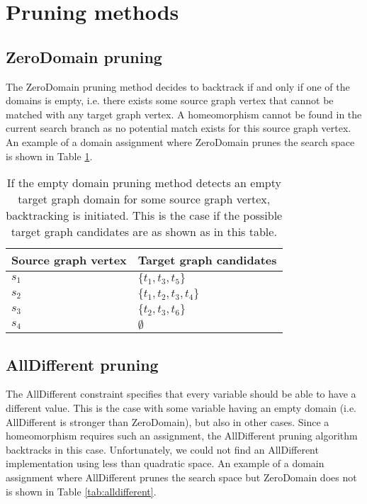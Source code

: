 \section{Pruning methods}
\label{sec:pruningmethods}
\subsection{ZeroDomain pruning}
The ZeroDomain pruning method decides to backtrack if and only if one of the domains is empty, i.e. there exists some source graph vertex that cannot be matched with any target graph vertex. A homeomorphism cannot be found in the current search branch as no potential match exists for this source graph vertex. An example of a domain assignment where ZeroDomain prunes the search space is shown in Table \ref{tab:zerodomain}.

\label{sec:emptyDomain}
\begin{table}
\centering
\begin{tabular}{|l|l|}
\hline
\textbf{Source graph vertex} & \textbf{Target graph candidates} \\ \hline
$s_1$                          & $\{t_1, t_3, t_5\}$         \\ \hline
$s_2$                          & $\{t_1, t_2, t_3, t_4\}$       \\ \hline
$s_3$                          & $\{t_2, t_3, t_6\}$      \\ \hline
$s_4$                          & $\emptyset$                      \\ \hline
\end{tabular}
\caption{If the empty domain pruning method detects an empty target graph domain for some source graph vertex, backtracking is initiated. This is the case if the possible target graph candidates are as shown as in this table.}
\label{tab:zerodomain}
\end{table}

\subsection{AllDifferent pruning}
\label{sec:alldifferent}
The AllDifferent constraint specifies that every variable should be able to have a different value. This is the case with some variable having an empty domain (i.e. AllDifferent is stronger than ZeroDomain), but also in other cases. Since a homeomorphism requires such an assignment, the AllDifferent pruning algorithm backtracks in this case. Unfortunately, we could not find an AllDifferent implementation using less than quadratic space. An example of a domain assignment where AllDifferent prunes the search space but ZeroDomain does not is shown in Table \ref{tab:alldifferent}. 

